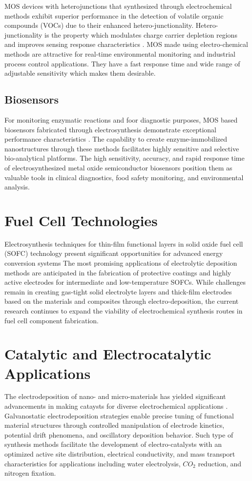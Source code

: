 \documentclass[12pt,a4paper]{report}
\begin{document}
	MOS devices with heterojunctions that synthesized through electrochemical methods exhibit superior performance in the detection of volatile organic compounds (VOCs) due to their enhanced hetero-junctionality. Hetero-junctionality is the property which modulates charge carrier depletion regions and improves sensing response characteristics \cite{Zhang2024}. MOS made using electro-chemical methods are attractive for real-time environmental monitoring and industrial process control applications. They have a fast response time and wide range of adjustable sensitivity which makes them desirable.
	\subsection{Biosensors}
	For monitoring enzymatic reactions and foor diagnostic purposes, MOS based biosensors fabricated through electrosynthesis demonstrate exceptional performance characteristics \cite{Dutta2023}. The capability to create enzyme-immobilized nanostructures through these methods facilitates highly sensitive and selective bio-analytical platforms. The high sensitivity, accuracy, and rapid response time of electrosynthesized metal oxide semiconductor biosensors position them as valuable tools in clinical diagnostics, food safety monitoring, and environmental analysis.
	\section{Fuel Cell Technologies}
	Electrosynthesis techniques for thin-film functional layers in solid oxide fuel cell (SOFC) technology present significant opportunities for advanced energy conversion systems \cite{Kalinina2025} The most promising applications of electrolytic deposition methods are anticipated in the fabrication of protective coatings and highly active electrodes for intermediate and low-temperature SOFCs. While challenges remain in creating gas-tight solid electrolyte layers and thick-film electrodes based on the materials and composites through electro-deposition, the current research continues to expand the viability of electrochemical synthesis routes in fuel cell component fabrication.
	\section{Catalytic and Electrocatalytic Applications}
	The electrodeposition of nano- and micro-materials has yielded significant advancements in making cataysts for diverse electrochemical applications \cite{Tovaroliva2024}. Galvanostatic electrodeposition strategies enable precise tuning of functional material structures through controlled manipulation of electrode kinetics, potential drift phenomena, and oscillatory deposition behavior. Such type of synthesis methods facilitate the development of electro-catalysts with an optimized active site distribution, electrical conductivity, and mass transport characteristics for applications including water electrolysis, $CO_2$ reduction, and nitrogen fixation.
	
\end{document}
